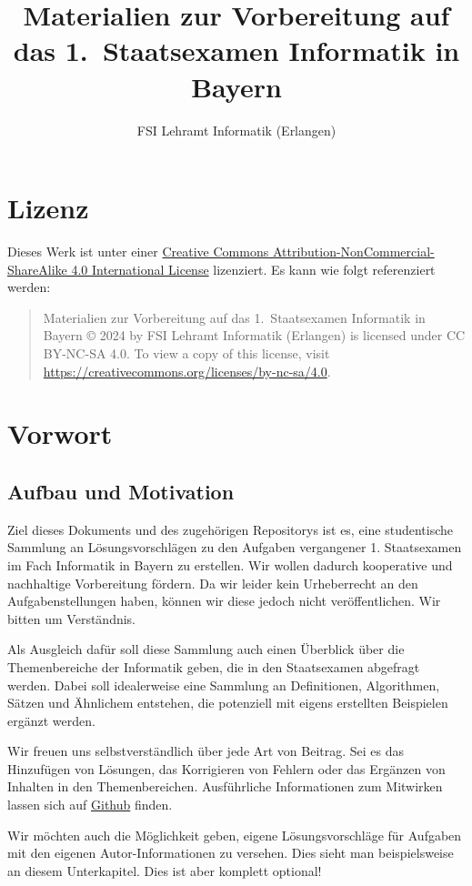 \documentclass[a4paper,ngerman]{report}
\title{Materialien zur Vorbereitung auf das 1.~Staatsexamen Informatik in Bayern}
\author{FSI Lehramt Informatik (Erlangen)}
\begin{document}
\maketitle
\chapter*{Lizenz}
Dieses Werk ist unter einer
\href{https://creativecommons.org/licenses/by-nc-sa/4.0/}{Creative Commons
Attribution-NonCommercial-ShareAlike 4.0 International License} lizenziert. Es
kann wie folgt referenziert werden:
\begin{quote}
  Materialien zur Vorbereitung auf das 1.~Staatsexamen Informatik in Bayern
  \copyright{} 2024 by FSI Lehramt Informatik (Erlangen) is licensed under CC BY-NC-SA 4.0.
  To view a copy of this license, visit \url{https://creativecommons.org/licenses/by-nc-sa/4.0}.
\end{quote}

\tableofcontents
\chapter{Vorwort}
\section{Aufbau und Motivation}
Ziel dieses Dokuments und des zugehörigen Repositorys ist es, eine studentische
Sammlung an Lösungsvorschlägen zu den Aufgaben vergangener 1. Staatsexamen im
Fach Informatik in Bayern zu erstellen. Wir wollen dadurch kooperative und
nachhaltige Vorbereitung fördern. Da wir leider kein Urheberrecht an den
Aufgabenstellungen haben, können wir diese jedoch nicht veröffentlichen. Wir
bitten um Verständnis.

Als Ausgleich dafür soll diese Sammlung auch einen Überblick über die
Themenbereiche der Informatik geben, die in den Staatsexamen abgefragt werden.
Dabei soll idealerweise eine Sammlung an Definitionen, Algorithmen, Sätzen und
Ähnlichem entstehen, die potenziell mit eigens erstellten Beispielen ergänzt
werden.

Wir freuen uns selbstverständlich über jede Art von Beitrag. Sei es das Hinzufügen von Lösungen,
das Korrigieren von Fehlern oder das Ergänzen von Inhalten in den
Themenbereichen. Ausführliche Informationen zum Mitwirken lassen sich auf
\href{https://github.com/fsi-la-inf/stex-stuff/.github/CONTRIBUTING.md}{Github} finden.

Wir möchten auch die Möglichkeit geben, eigene Lösungsvorschläge für
Aufgaben mit den eigenen Autor-Informationen zu versehen. Dies sieht man
beispielsweise an diesem Unterkapitel. Dies ist aber komplett optional!




\printindex{}
\end{document}
